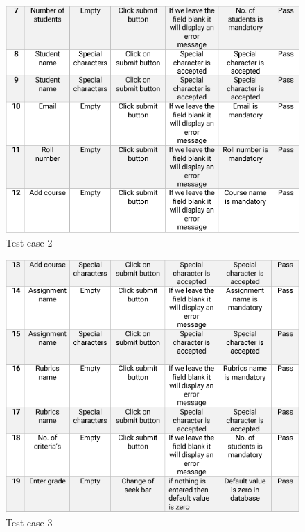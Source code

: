\begin{figure}[H]
\centering
\hfill\includegraphics[scale=0.9]{project/images/test2}\hspace*{\fill}
\caption{Test case 2}
\end{figure}

\begin{figure}[H]
\centering
\hfill\includegraphics[scale=0.9]{project/images/test3}\hspace*{\fill}
\caption{Test case 3}
\end{figure}